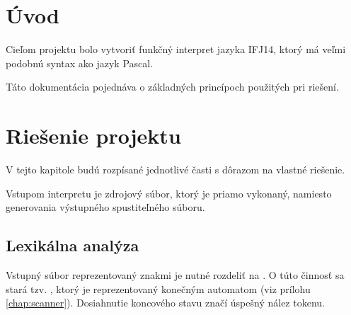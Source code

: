 \documentclass[12pt,a4paper,titlepage,final]{article}
\begin{document}

\def\author{TODO}
\def\email{xloginXX@stud.fit.vutbr.cz}
\def\projname{Interpret jazyka IFJ14}



\pagestyle{plain}
\setcounter{page}{1}
\tableofcontents

\listoftodos[Notes]

\newpage
\pagestyle{plain}
\setcounter{page}{1}

\section{Úvod} \label{uvod}

Cieľom projektu bolo vytvoriť funkčný interpret jazyka IFJ14, ktorý má veľmi
 podobnú syntax ako jazyk Pascal.

Táto dokumentácia pojednáva o základných princípoch použitých pri riešení.


\section{Riešenie projektu} \label{riesenie}
V tejto kapitole budú rozpísané jednotlivé časti s dôrazom na vlastné riešenie.

Vstupom interpretu je zdrojový súbor, ktorý je priamo vykonaný, namiesto
generovania výstupného spustiteľného súboru.
\subsection{Lexikálna analýza}
Vstupný súbor reprezentovaný znakmi je nutné rozdeliť na .
O túto činnosť sa stará tzv. , ktorý je reprezentovaný konečným
automatom (viz prílohu \ref{chap:scanner}). Dosiahnutie koncového stavu
značí úspešný nález tokenu.
\end{document}
